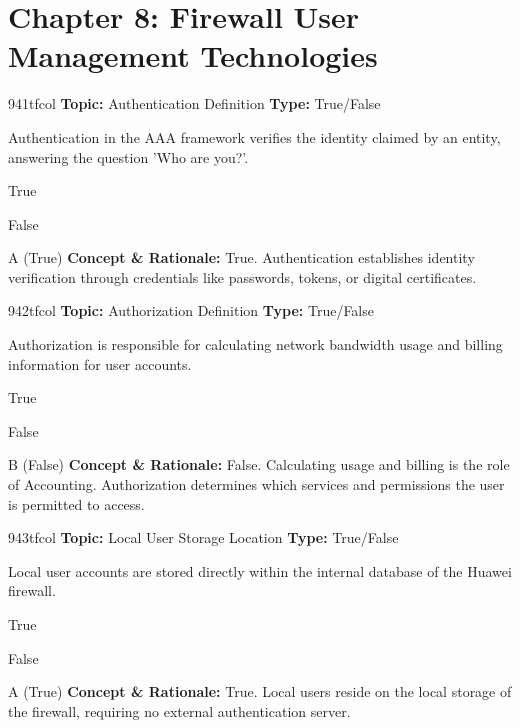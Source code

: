 \section{Chapter 8: Firewall User Management Technologies}

\begin{qcard}{941}{tfcol}
\textcolor{darkslate!75}{\small\textbf{Topic:} Authentication Definition \hfill \textbf{Type:} True/False}\vspace{0.4em}\par
Authentication in the AAA framework verifies the identity claimed by an entity, answering the question 'Who are you?'.
\begin{qoptions}
\item True
\item False
\end{qoptions}
\end{qcard}
\nopagebreak
\begin{explainbox}{A (True)}
\textbf{Concept \& Rationale:} True. Authentication establishes identity verification through credentials like passwords, tokens, or digital certificates.
\end{explainbox}

\begin{qcard}{942}{tfcol}
\textcolor{darkslate!75}{\small\textbf{Topic:} Authorization Definition \hfill \textbf{Type:} True/False}\vspace{0.4em}\par
Authorization is responsible for calculating network bandwidth usage and billing information for user accounts.
\begin{qoptions}
\item True
\item False
\end{qoptions}
\end{qcard}
\nopagebreak
\begin{explainbox}{B (False)}
\textbf{Concept \& Rationale:} False. Calculating usage and billing is the role of Accounting. Authorization determines which services and permissions the user is permitted to access.
\end{explainbox}

\begin{qcard}{943}{tfcol}
\textcolor{darkslate!75}{\small\textbf{Topic:} Local User Storage Location \hfill \textbf{Type:} True/False}\vspace{0.4em}\par
Local user accounts are stored directly within the internal database of the Huawei firewall.
\begin{qoptions}
\item True
\item False
\end{qoptions}
\end{qcard}
\nopagebreak
\begin{explainbox}{A (True)}
\textbf{Concept \& Rationale:} True. Local users reside on the local storage of the firewall, requiring no external authentication server.
\end{explainbox}


